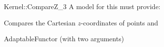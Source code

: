 \begin{ccRefFunctionObjectConcept}{Kernel::CompareZ_3}
A model for this must provide:


      {Compares the Cartesian $z$-coordinates of points  and
      }

\ccRefines
AdaptableFunctor (with two arguments)

\ccSeeAlso
{} \\

\end{ccRefFunctionObjectConcept}
